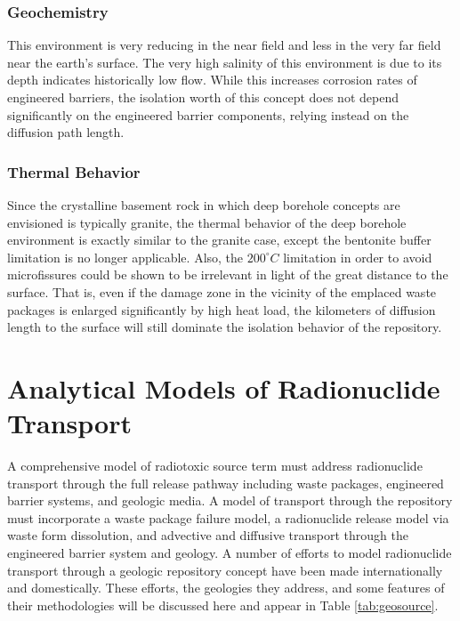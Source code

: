 \subsubsection{Geochemistry}

This environment is very reducing in the near field and less in the very 
far field near the earth's surface. The very high salinity of this environment
is due to its depth indicates historically low flow. While this increases 
corrosion rates of engineered barriers, the isolation worth of this concept 
does not depend significantly on the engineered barrier components, relying 
instead on the diffusion path length.  


\subsubsection{Thermal Behavior}
\label{subsec:boreholethermal}

Since the crystalline basement rock in which deep borehole concepts are 
envisioned is typically granite, the thermal behavior of the deep borehole 
environment is exactly similar to the granite case, except the bentonite buffer 
limitation is no longer applicable.  Also, the $200^{\circ}C$ limitation in 
order to avoid microfissures could  be shown to be irrelevant in light of the 
great distance to the surface. That is, even if the damage zone in the vicinity 
of the emplaced waste packages is enlarged significantly by high heat load, 
the kilometers of diffusion length to the surface will still dominate the 
isolation behavior of the repository. 



\section{Analytical Models of Radionuclide Transport} \label{sec:analytical_nuc}


A comprehensive model of radiotoxic source term must address radionuclide transport
through the full release pathway including waste packages, engineered barrier
systems, and geologic media. A model of transport through the repository 
must incorporate a waste package failure model, a radionuclide release model via 
waste form dissolution, and advective and diffusive transport through the 
engineered barrier system and geology. A number of efforts to model 
radionuclide transport through a geologic repository concept have been made 
internationally and domestically. These efforts, the geologies they address, and  
some features of their methodologies will be discussed here and appear in Table 
\ref{tab:geosource}.

